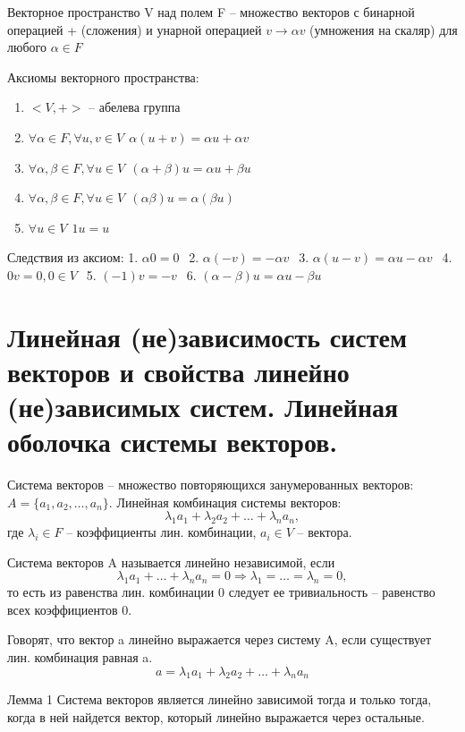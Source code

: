 \documentclass{article}
\begin{document}
\textsf{Векторное пространство V над полем F – множество векторов с бинарной операцией + (сложения) и унарной операцией $v\to\alpha v$ (умножения на скаляр) для любого $\alpha\in F$}

Аксиомы векторного пространства:
\begin{enumerate}
    \item $<V, +>$ – абелева группа
    \item $\forall\alpha\in F, \forall u,v\in V\ \ \alpha(u+v)=\alpha u+\alpha v$
    \item $\forall\alpha,\beta\in F, \forall u\in V\ \ (\alpha+\beta)u=\alpha u+\beta u$
    \item $\forall\alpha,\beta\in F, \forall u\in V\ \ (\alpha\beta)u=\alpha(\beta u)$
    \item $\forall u\in V\ \ 1u=u$
\end{enumerate}

Следствия из аксиом:
1. $\alpha 0=0\ \ $
2. $\alpha (-v)=-\alpha v\ \ $
3. $\alpha(u-v)=\alpha u-\alpha v\ \ $
4. $0v=0, 0\in V\ \ $
5. $(-1)v=-v\ \ $
6. $(\alpha-\beta)u=\alpha u-\beta u$

\section{Линейная (не)зависимость систем векторов и свойства линейно (не)зависимых систем. Линейная оболочка системы векторов.}

Система векторов – множество повторяющихся занумерованных векторов: $A = \{a_1,a_2,\dots,a_n\}$. Линейная комбинация системы векторов:
$$\lambda_1a_1+\lambda_2a_2+\dots+\lambda_na_n,$$
где $\lambda_i\in F$ – коэффициенты лин. комбинации, $a_i\in V$ – вектора.

Система векторов A называется \textsf{линейно независимой}, если
$$\lambda_1a_1+\dots+\lambda_na_n=0\Rightarrow \lambda_1=\dots=\lambda_n=0,$$
то есть из равенства лин. комбинации 0 следует ее тривиальность – равенство всех коэффициентов 0.

Говорят, что вектор a \textsf{линейно выражается} через систему A, если существует лин. комбинация равная a.
$$a=\lambda_1a_1+\lambda_2a_2+\dots+\lambda_na_n$$

\textsf{Лемма 1}
Система векторов является \textsf{линейно зависимой} тогда и только тогда, когда в ней найдется вектор, который линейно выражается через остальные.
\end{document}
